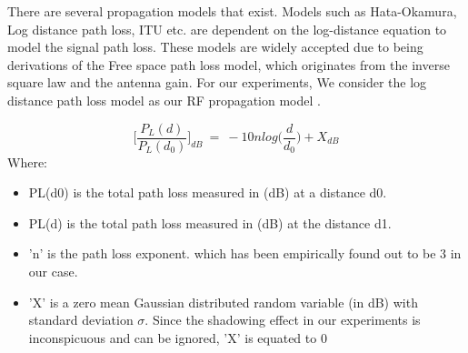 \documentclass[twocolumn, 11pt]{IEEEtran}
\begin{document}

There are several propagation models that exist. Models such as Hata-Okamura, Log distance path loss, ITU etc. are dependent on the log-distance equation to model the signal path loss. These models are widely accepted due to being derivations of the Free space path loss model, which originates from the inverse square law and the antenna gain. For our experiments, We consider the log distance path loss model as our RF propagation model \cite{sarkar2003survey, soorty2015finding}.

\begin{equation}
\Bigg[\frac{P_{L}(d)}{P_{L}(d_{0})}\Bigg]_{dB}  ~=~ -10n log\Bigg(\frac{d}{d_{0}}\Bigg) + X_{dB}
\label{pathlosseqn}
\end{equation}
Where:

\begin{itemize}
 \item PL(d0) is the total path loss measured in (dB) at a distance d0.

\item PL(d) is the total path loss measured in (dB) at the distance d1.

\item 'n' is the path loss exponent. which has been empirically found out to be 3 in our case. 

\item 'X' is a zero mean Gaussian distributed random variable (in dB) with standard deviation \( \sigma \). Since the shadowing effect in our experiments is inconspicuous and can be ignored, 'X' is equated to 0
 
\end{itemize}
\end{document}
